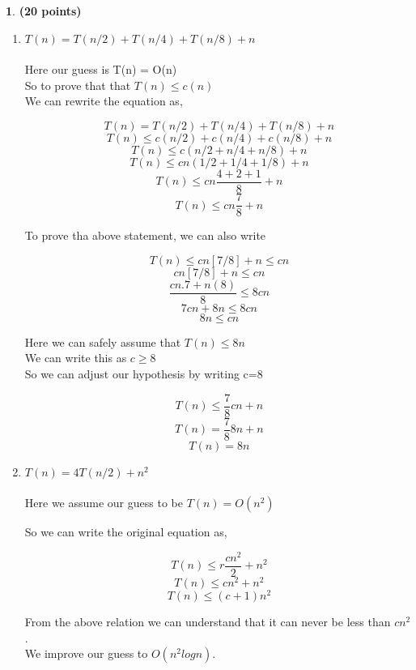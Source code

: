 \documentclass[11pt]{article}
\theoremstyle{definition}
\newtheorem{prob}{}
\newcommand{\solution}{\medskip\noindent{\color{DarkBlue}\textbf{Solution:}}}
\begin{document}
 
\begin{prob} \textbf{(20 points)}
\end{prob}
\begin{enumerate}
    \item $T(n)= T(n/2) + T(n/4) + T(n/8) + n$ \\
    \solution \\

    Here our guess is T(n) = O(n) \\ 
    
    So to prove that that $ T(n) \leq c(n) $ \\

    We can rewrite the equation as,

    \[ T(n)= T(n/2) + T(n/4) + T(n/8) + n\]
    \[ T(n) \leq c(n/2) + c(n/4) + c(n/8) + n \]
    \[ T(n) \leq c(n/2 + n/4 +n/8) + n \]
    \[ T(n) \leq cn(1/2 + 1/4 +1/8) + n \]
    \[ T(n) \leq cn\frac{4+2+1}{8} + n \]
    \[ T(n) \leq cn\frac{7}{8} + n \]

    To prove tha above statement, we can also write

    \[ T(n) \leq cn[7/8] + n \leq cn \]
    \[ cn[7/8] + n \leq cn \]
    \[ \frac{cn.7 + n(8)}{8} \leq 8cn \]
    \[ 7cn + 8n \leq 8cn \]
    \[ 8n \leq cn \]

    Here we can safely assume that $ T(n) \leq 8n$ \\

    We can write this as $c \geq 8$ \\

    So we can adjust our hypothesis by writing c=8

    \[ T(n) \leq \frac{7}{8}cn + n \]
    \[ T(n) = \frac{7}{8}8n + n \]
    \[ T(n) = 8n \]

    \item $T(n)= 4T(n/2)+ n^2$ \\
    \solution \\

    Here we assume our guess to be $T(n) = O(n^2)$

    So we can write the original equation as,

    \[ T(n) \leq r\frac{cn^2}{2} + n^2 \]
    \[ T(n) \leq cn^2 + n^2 \]
    \[ T(n) \leq (c+1)n^2 \]

    From the above relation we can understand that it can never be less than $cn^2$. \\

    We improve our guess to $O(n^2logn)$. \\


\end{enumerate}
\end{document}
